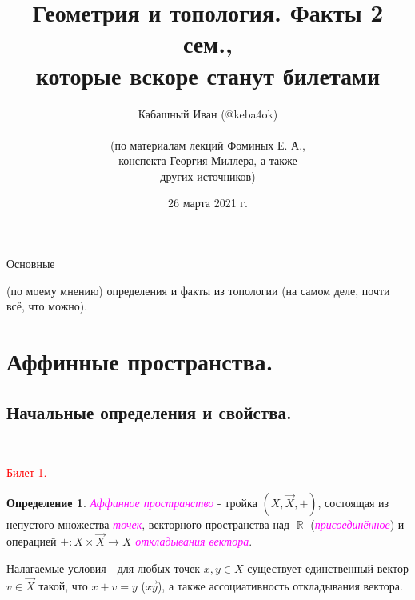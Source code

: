 \documentclass[a4paper,100pt]{article}
\title{Геометрия и топология. Факты 2 сем., \\ которые вскоре станут билетами}
\author{Кабашный Иван (@keba4ok)\\ \\ (по материалам лекций Фоминых Е. А.,\\ конспекта Георгия Миллера, а также \\ других источников)}
\date{26 марта 2021 г.}
\theoremstyle{indented}
\theoremstyle{definition}
\newtheorem{defn}{Определение}
\theoremstyle{remark}
\DeclareMathOperator{\ra}{\rightarrow}
\DeclareMathOperator{\RR}{\mathbb{R}}
\begin{document}
\newcommand{\resetexlcounters}{%
  \setcounter{exl}{0}%
} 

\newcommand{\resetremarkcounters}{%
  \setcounter{remark}{0}%
} 

\newcommand{\reseconscounters}{%
  \setcounter{cons}{0}%
} 

\newcommand{\resetall}{%
    \resetexlcounters
    \resetremarkcounters
    \reseconscounters%
}

\maketitle 

\newpage

\hypertarget{t1}{Основные} (по моему мнению) определения и факты из топологии (на самом деле, почти всё, что можно).
\tableofcontents

\newpage


\section{Аффинные пространства.}

\subsection{Начальные определения и свойства.} \ 

\textcolor{red}{\hypertarget{b1}{Билет 1.}}

\begin{defn}
    \textit{\textcolor{magenta}{\hypertarget{s1}{Аффинное пространство}}} - тройка $(X, \vec{X}, +)$, состоящая из непустого множества \textit{\textcolor{magenta}{\hypertarget{s2}{точек}}}, векторного пространства над $\RR$ (\textit{\textcolor{magenta}{\hypertarget{s3}{присоединённое}}}) и операцией $+:X\times \vec{X}\ra X$ \textit{\textcolor{magenta}{\hypertarget{s4}{откладывания вектора}}}. \ 

    Налагаемые условия - для любых точек $x, y\in X$ существует единственный вектор $v\in \vec{X}$ такой, что $x+v=y$ ($\vec{xy}$), а также ассоциативность откладывания вектора.
\end{defn}
\end{document}
